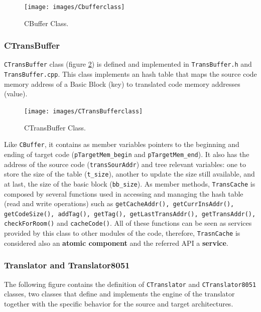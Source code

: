 \begin{figure}[!htb]
\centerline{
\texttt{[image: images/Cbufferclass]}}
\caption{CBuffer Class.}
\label{fig:cbufferclass} 
\end{figure}

\subsubsection*{CTransBuffer}

\texttt{CTransBuffer} class (figure \ref{fig:tbufferclass}) is defined and implemented in \texttt{TransBuffer.h} and \texttt{TransBuffer.cpp}. This class implements an hash table that maps the source code memory address of a Basic Block (key) to translated code memory addresses (value). 

\begin{figure}[!htb]
\centerline{
\texttt{[image: images/CTransBufferclass]}}
\caption{CTransBuffer Class.}
\label{fig:tbufferclass} 
\end{figure}

Like \texttt{CBuffer}, it contains as member variables pointers to the beginning and ending of target code (\texttt{pTargetMem\_begin} and \texttt{pTargetMem\_end}). It also has the address of the source code (\texttt{transSourAddr}) and tree relevant variables: one to store the size of the table (\texttt{t\_size}), another to update the size still available, and at last, the size of the basic block (\texttt{bb\_size}). As member methods, \texttt{TransCache} is composed by several functions used in accessing and managing the hash table (read and write operations) such as \texttt{getCacheAddr(), getCurrInsAddr(), getCodeSize(), addTag(), getTag(), getLastTransAddr(), getTransAddr(), checkForRoom()} and \texttt{cacheCode()}. All of these functions can be seen as services provided by this class to other modules of the code, therefore, \texttt{TrasnCache} is considered also an \textbf{atomic component} and the referred API a \textbf{service}.




\subsubsection*{Translator and Translator8051}

The following figure contains the definition of \texttt{CTranslator} and \texttt{CTranslator8051} classes, two classes that define and implements the engine of the translator together with the specific behavior for the source and target architectures. 

